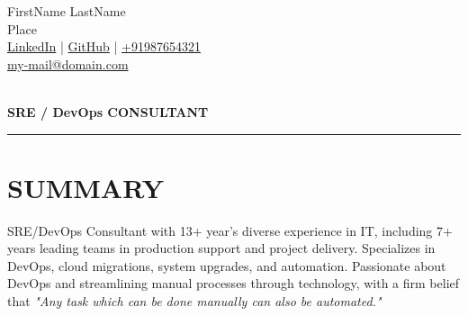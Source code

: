 \documentclass[11pt]{article}
\begin{document}
	\begin{flushleft}
		\noindent
		{{\fontsize{14}{16}\selectfont F}irstName} {{\fontsize{14}{16}\selectfont L}astName}\\
		Place\\ \href{https://linkedin.com/in/linked-in-name}{LinkedIn} | \href{https://github.com/github-name}{GitHub} | 
		\href{https://wa.me/+91987654321}{+91987654321}\\
		\href{mailto:my-mail@domain.com}{my-mail@domain.com} \\
		\\ [-01em]
	\end{flushleft}
	
	{\centering \Large \textbf{SRE / DevOps CONSULTANT} \par}
	
	\vspace{0.5cm}
	\hrule
	\vspace{-0.8em}	
	
	\vspace{-0.8em}	
	\section*{{\fontsize{15}{22}\selectfont S}UMMARY} 
	\vspace{-1em}
	SRE/DevOps Consultant with 13+ year's diverse experience in IT, including 7+ years leading teams in production support and project delivery. Specializes in DevOps, cloud migrations, system upgrades, and automation. Passionate about DevOps and streamlining manual processes through technology, with a firm belief that \textit{"Any task which can be done manually can also be automated."}
	
\end{document}
